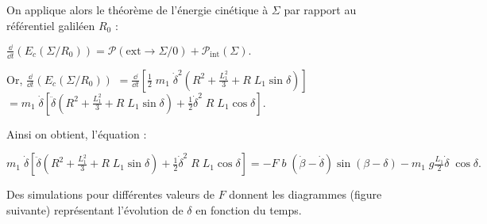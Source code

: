 \ifprof
\begin{corrige}
On applique alors le théorème de l'énergie cinétique à $\Sigma$ par rapport au référentiel galiléen $R_0$ :

$
\frac{\dd }{\dd t}(E_c(\Sigma/R_0))=\mathcal{P}(\text{ext}\rightarrow \Sigma/0)+\mathcal{P}_\text{int}( \Sigma).
$

Or, $
\frac{\dd }{\dd t}(E_c(\Sigma/R_0))$ 
$=\frac{\dd }{\dd t}\left[\frac{1}{2}\;m_1\;\dot{\delta}^2\left(R^2+\frac{L_1^2}{3}+R\;L_1\sin\delta\right)\right]$
$=m_1\;\dot{\delta}\left[\ddot{\delta}\left(R^2+\frac{L_1^2}{3}+R\;L_1\sin\delta\right)+\frac{1}{2}\dot{\delta}^2\;R\;L_1\cos\delta\right]$.


Ainsi on obtient, l'équation :


$
\boxed{
m_1\;\dot{\delta}\left[\ddot{\delta}\left(R^2+\frac{L_1^2}{3}+R\;L_1\sin\delta\right)+\frac{1}{2}\dot{\delta}^2\;R\;L_1\cos\delta\right]
=-F\;b\;\left(\dot{\beta}-\dot{\delta}\right)\sin(\beta-\delta)-m_1\;g\frac{L_1}{2}\dot{\delta}\;\cos\delta.
}
$

\end{corrige}
\else
\fi

\ifprof
\else
\ifcolle
\else
\noindent
{}
\fi
\fi



Des simulations pour différentes valeurs de $F$ donnent les diagrammes (figure suivante) représentant l'évolution de $\delta$ en fonction du temps.

